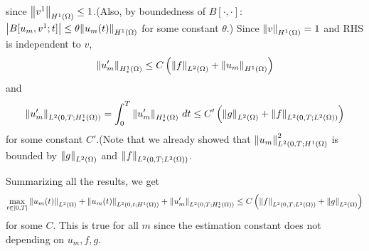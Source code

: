 \documentclass{article}
\begin{document}
\begin{enumerate}
since $\norm{v^1}_{H^1(\Omega)}\leq 1$.(Also, by boundedness of $B[\cdot,\cdot]$: $\abs{B[u_m,v^1;t]}\leq \theta \norm{u_m(t)}_{H^1(\Omega)}$ for some constant $\theta$.) Since $\norm{v}_{H^1(\Omega)}=1$ and RHS is independent to $v$, 
\begin{equation*}
\norm{u'_m}_{H^1_*(\Omega)}\leq C\left(\norm{f}_{L^2(\Omega)}+\norm{u_m}_{H^1(\Omega)}\right)
\end{equation*}
and
\begin{equation*}
\norm{u'_m}_{L^2(0,T;H^1_*(\Omega))}=\int_0^T \norm{u'_m}_{H^1_*(\Omega)}\ dt\leq C'\left(\norm{g}_{L^2(\Omega)}+\norm{f}_{L^2(0,T;L^2(\Omega))}\right)
\end{equation*}
for some constant $C'$.(Note that we already showed that $\norm{u_m}^2_{L^2(0,T;H^1(\Omega)}$ is bounded by $\norm{g}_{L^2(\Omega)}$ and $\norm{f}_{L^2(0,T;L^2(\Omega))}$.
\end{enumerate}
Summarizing all the results, we get
\begin{equation*}
\max_{t\in [0,T]}\norm{u_m(t)}_{L^2(\Omega)}+\norm{u_m(t)}_{L^2(0, t;H^1(\Omega))}+\norm{u'_m}_{L^2(0,T;H	_*^1(\Omega))}\leq C\left(\norm{f}_{L^2(0,T;L^2(\Omega))}+\norm{g}_{L^2(\Omega)}\right)
\end{equation*}
for some $C$. This is true for all $m$ since the estimation constant does not depending on $u_m, f, g$.
\end{document}
